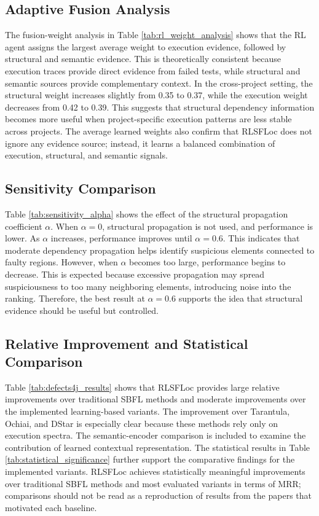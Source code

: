 \documentclass[article,article,submit,pdftex,moreauthors]{Definitions/mdpi}
\begin{document}
\subsection{Adaptive Fusion Analysis}

The fusion-weight analysis in Table \ref{tab:rl_weight_analysis} shows that the RL agent assigns the largest average weight to execution evidence, followed by structural and semantic evidence. This is theoretically consistent because execution traces provide direct evidence from failed tests, while structural and semantic sources provide complementary context. In the cross-project setting, the structural weight increases slightly from 0.35 to 0.37, while the execution weight decreases from 0.42 to 0.39. This suggests that structural dependency information becomes more useful when project-specific execution patterns are less stable across projects. The average learned weights also confirm that RLSFLoc does not ignore any evidence source; instead, it learns a balanced combination of execution, structural, and semantic signals.

\subsection{Sensitivity Comparison}

Table \ref{tab:sensitivity_alpha} shows the effect of the structural propagation coefficient $\alpha$. When $\alpha=0$, structural propagation is not used, and performance is lower. As $\alpha$ increases, performance improves until $\alpha=0.6$. This indicates that moderate dependency propagation helps identify suspicious elements connected to faulty regions. However, when $\alpha$ becomes too large, performance begins to decrease. This is expected because excessive propagation may spread suspiciousness to too many neighboring elements, introducing noise into the ranking. Therefore, the best result at $\alpha=0.6$ supports the idea that structural evidence should be useful but controlled.

\subsection{Relative Improvement and Statistical Comparison}

Table \ref{tab:defects4j_results} shows that RLSFLoc provides large relative improvements over traditional SBFL methods and moderate improvements over the implemented learning-based variants. The improvement over Tarantula, Ochiai, and DStar is especially clear because these methods rely only on execution spectra. The semantic-encoder comparison is included to examine the contribution of learned contextual representation. The statistical results in Table \ref{tab:statistical_significance} further support the comparative findings for the implemented variants. RLSFLoc achieves statistically meaningful improvements over traditional SBFL methods and most evaluated variants in terms of MRR; comparisons should not be read as a reproduction of results from the papers that motivated each baseline.
\end{document}
